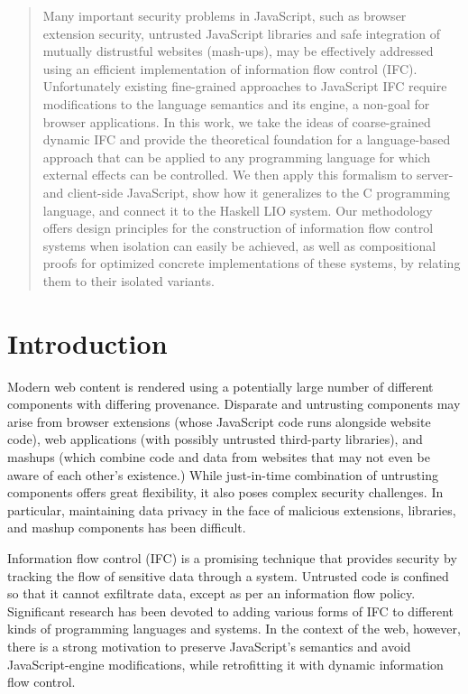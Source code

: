 \documentclass{llncs}
\begin{document}
\maketitle

\begin{abstract}
Many important security problems in JavaScript, such as browser
extension security, untrusted JavaScript libraries and safe
integration of mutually distrustful websites (mash-ups), may be
effectively addressed using an efficient implementation of information
flow control (IFC).  Unfortunately existing fine-grained approaches to
JavaScript IFC require modifications to the language semantics and its engine, a
non-goal for browser applications.  In this work, we take the ideas of
coarse-grained dynamic IFC and provide the theoretical
foundation for a language-based approach that can be applied to any
programming language for which external effects can be controlled.  We
then apply this formalism to server- and client-side JavaScript,
show how it generalizes to the C programming language, and connect it
to the Haskell LIO system.  Our methodology offers
design principles for the construction of information flow control
systems when isolation can easily be achieved, as well as
compositional proofs for optimized concrete implementations of these
systems, by relating them to their isolated variants.
\end{abstract}
\section{Introduction}
\label{sec:intro}


Modern web content is rendered using a potentially large number of
different components with differing provenance.
Disparate and untrusting components may arise from browser
extensions (whose JavaScript code runs alongside website
code), web applications (with possibly untrusted third-party
libraries), and mashups (which combine code and data from
websites that may not even be aware of each other's existence.)
While just-in-time combination of untrusting components
offers great flexibility, it also poses complex security challenges.
In particular, maintaining data privacy in the face of malicious
extensions, libraries, and mashup components has been difficult.


Information flow control (IFC) is a promising technique
that provides security
by tracking the flow of sensitive data through a system.
Untrusted code is confined so that it cannot exfiltrate data, except as
per an information flow policy.  Significant research has been devoted to
adding various forms of IFC to different kinds of programming languages
and systems.  In the context of the web, however, there is a strong
motivation to preserve JavaScript's semantics and avoid
JavaScript-engine modifications, while retrofitting it with dynamic information
flow control.
\end{document}
